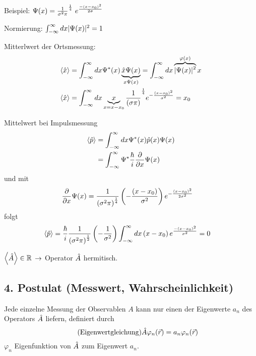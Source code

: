 \begin{bem}
    \item{Beispiel}: $\Psi(x) = \frac{1}{\sigma^2 \pi}^{\frac{1}{4}} \
            e^{\frac{-\left( x-x_0 \right)^2 }{2 \sigma}}$

    Normierung: $\int_{-\infty}^{\infty} dx \lvert \Psi(x)\rvert^2 = 1$

    \begin{erl}{Mitterlwert der Ortsmessung:}
    \begin{align*}
        \left\langle \hat{x} \right\rangle
        &=
        \int_{-\infty}^{\infty} dx \Psi^*(x)
        \underbrace{\hat{x} \Psi(x)}_{x\Psi(x)} 
        =
        \int_{-\infty}^{\infty} dx
        \overbrace{\lvert \Psi(x)\rvert^2}^{\varphi(x)}x \\
        \left\langle \hat{x} \right\rangle
        &=
        \int_{-\infty}^{\infty} dx \underbrace{x}_{x=x-x_0} \frac{1}{\left( \sigma \pi \right)}^{\frac{1}{4}} e^{-\frac{\left( x - x_0 \right)^2}{\sigma^2}}
        = x_0
    \end{align*}
    \end{erl}
    \begin{erl}{Mittelwert bei Impulsmessung}
    \begin{align*}
        \left\langle \hat{p} \right\rangle
        &=
        \int_{-\infty}^{\infty} dx \Psi^*(x)\hat{p}(x)\Psi(x)\\
        &=
        \int_{-\infty}^{\infty} \Psi^* \frac{\hbar}{i}
        \frac{\partial}{\partial x}\Psi(x)
    \end{align*}    
    und mit
    \begin{align*}
       \frac{\partial}{\partial x}\Psi(x) 
       &=
       \frac{1}{{\left( \sigma^2 \pi
       \right)}^{\frac{1}{4}}} \left( - \frac{\left( x- x_0 \right)}{\sigma^2}\right) 
       e^{- \frac{\left( x - x_0 \right)^2}{2\sigma^2}}
    \end{align*}
    folgt
    \begin{align*}
        \left\langle \hat{p} \right\rangle
        &=
        \frac{\hbar}{i} \frac{1}{{\left( \sigma^2 \pi \right)}^{\frac{1}{2}}}
        \left( - \frac{1}{\sigma^2}\right)  \int_{-\infty}^{\infty} dx \left( x - x_0 \right) 
        e^{\frac{- \left( x - x_0 \right)^2}{\sigma^2}} = 0
    \end{align*}
    \end{erl}
    \item
    $\left\langle \hat{A} \right\rangle \in \mathbb{R}$ $\rightarrow$ Operator $\hat{A}$
    hermitisch.
\end{bem}
\subsection{4. Postulat (Messwert, Wahrscheinlichkeit)} %
\label{ssub:4._Postulat_(Messwert,_Wahrscheinlichkeit)}
Jede einzelne Messung der Observablen $A$ kann nur einen der Eigenwerte $a_n$
des Operators $\hat{A}$ liefern, definiert durch
\begin{equation*}
    \tag{Eigenwertgleichung}
    \hat{A}\varphi_n(\vec{r}) = a_n \varphi_n(\vec{r})
\end{equation*}
$\varphi_n$ Eigenfunktion von $\hat{A}$ zum Eigenwert $a_n$.

